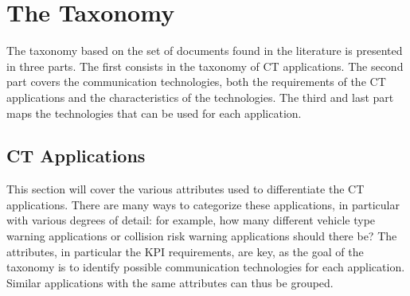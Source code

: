 \section{The Taxonomy}

The taxonomy based on the set of documents found in the literature is presented in three parts. The first consists in the taxonomy of \acrshort{CT} applications. The second part covers the communication technologies, both the requirements of the \acrshort{CT} applications and the characteristics of the technologies. The third and last part maps the technologies that can be used for each application. 

\subsection{\acrshort{CT} Applications}


This section will cover the various attributes used to differentiate the \acrshort{CT} applications. There are many ways to categorize these applications, in particular with various degrees of detail: for example, how many different vehicle type warning applications or collision risk warning applications should there be? The attributes, in particular the \acrshort{KPI} requirements, are key, as the goal of the taxonomy is to identify possible communication technologies for each application. Similar applications with the same attributes can thus be grouped. 


